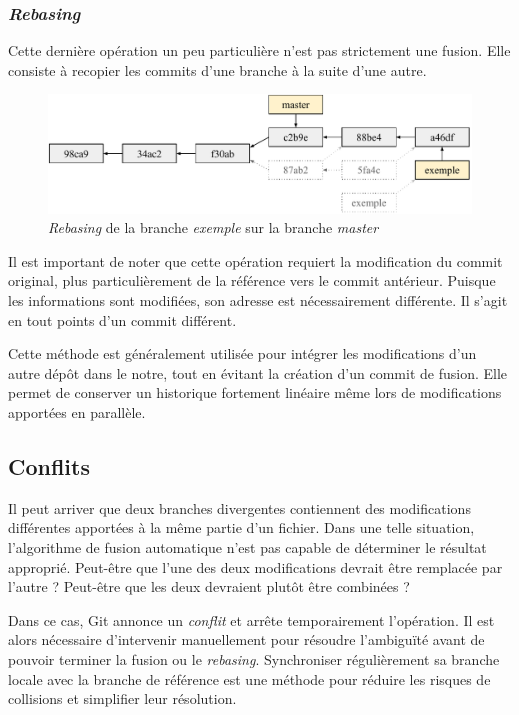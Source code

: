 \documentclass[11pt,a4paper]{article}
\begin{document}
\subsubsection{\textit{Rebasing}}

Cette dernière opération un peu particulière n'est pas strictement une fusion. Elle consiste à recopier les commits d'une branche à la suite d'une autre.

\begin{figure}[ht]
\begin{center}
\includegraphics[width=13cm]{img_rebase}
\caption{\textit{Rebasing} de la branche \textit{exemple} sur la branche \textit{master}}
\end{center}
\end{figure}

Il est important de noter que cette opération requiert la modification du commit original, plus particulièrement de la référence vers le commit antérieur.
Puisque les informations sont modifiées, son adresse est nécessairement différente. Il s'agit en tout points d'un commit différent.

Cette méthode est généralement utilisée pour intégrer les modifications d'un autre dépôt dans le notre, tout en évitant la création d'un commit de fusion.
Elle permet de conserver un historique fortement linéaire même lors de modifications apportées en parallèle.

\subsection{Conflits}

Il peut arriver que deux branches divergentes contiennent des modifications différentes apportées à la même partie d'un fichier. Dans une telle situation, l'algorithme de fusion automatique n'est pas capable de déterminer le résultat approprié.
Peut-être que l'une des deux modifications devrait être remplacée par l'autre ?
Peut-être que les deux devraient plutôt être combinées ?

Dans ce cas, Git annonce un \textit{conflit} et arrête temporairement l'opération.
Il est alors nécessaire d'intervenir manuellement pour résoudre l'ambiguïté avant de pouvoir terminer la fusion ou le \textit{rebasing}.
Synchroniser régulièrement sa branche locale avec la branche de référence est une méthode pour réduire les risques de collisions et simplifier leur résolution.
\end{document}
